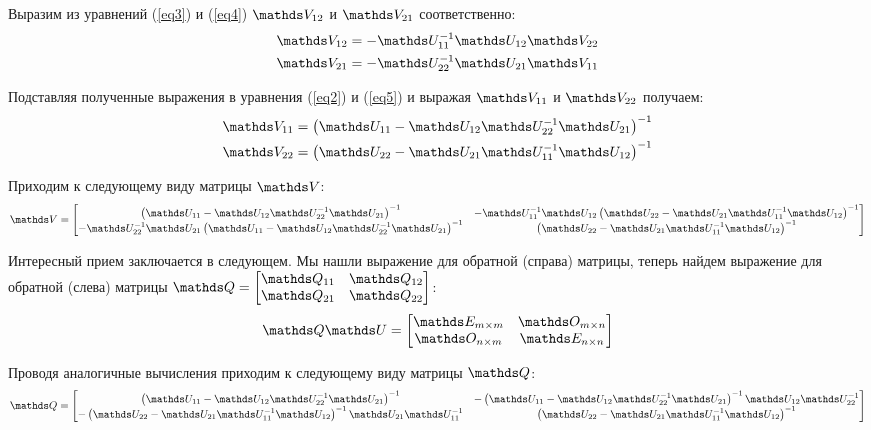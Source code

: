 Выразим из уравнений (\ref{eq3}) и (\ref{eq4}) $\bbV_{12}$ и $\bbV_{21}$ соответственно:
\begin{gather}
\bbV_{12} = - \bbU_{11}^{-1} \bbU_{12} \bbV_{22} \notag \\
\bbV_{21} = - \bbU_{22}^{-1} \bbU_{21} \bbV_{11} \notag
\end{gather}  

Подставляя полученные выражения в уравнения (\ref{eq2}) и (\ref{eq5}) и выражая $\bbV_{11}$ и $\bbV_{22}$ получаем:
\begin{gather}
\bbV_{11} = \lb \bbU_{11} - \bbU_{12} \bbU_{22}^{-1} \bbU_{21} \rb^{-1} \notag \\
\bbV_{22} = \lb \bbU_{22} - \bbU_{21} \bbU_{11}^{-1} \bbU_{12} \rb^{-1} \notag
\end{gather}

Приходим к следующему виду матрицы $\bbV$:
\begin{gather}
\bbV = \begin{bmatrix}
\lb \bbU_{11} - \bbU_{12} \bbU_{22}^{-1} \bbU_{21} \rb^{-1} & -\bbU_{11}^{-1} \bbU_{12} \lb \bbU_{22} - \bbU_{21} \bbU_{11}^{-1} \bbU_{12} \rb^{-1} \\
-\bbU_{22}^{-1} \bbU_{21} \lb \bbU_{11} - \bbU_{12} \bbU_{22}^{-1} \bbU_{21} \rb^{-1} &  \lb \bbU_{22} - \bbU_{21} \bbU_{11}^{-1} \bbU_{12} \rb^{-1} 
\end{bmatrix} \notag
\end{gather}

Интересный прием заключается в следующем.
Мы нашли выражение для обратной (справа) матрицы, теперь найдем выражение для обратной (слева) матрицы $\bbQ = \begin{bmatrix} \bbQ_{11} & \bbQ_{12} \\ \bbQ_{21} & \bbQ_{22} \end{bmatrix}$:
\begin{gather}
\bbQ \bbU = \begin{bmatrix}
\bbE_{m \times m} & \bbO_{m \times n} \\
\bbO_{n \times m} & \bbE_{n \times n} 
\end{bmatrix} \notag 
\end{gather} 

Проводя аналогичные вычисления приходим к следующему виду матрицы $\bbQ$:
\begin{gather}
\bbQ = \begin{bmatrix}
\lb \bbU_{11} - \bbU_{12} \bbU_{22}^{-1} \bbU_{21} \rb^{-1} & - \lb \bbU_{11} - \bbU_{12} \bbU_{22}^{-1} \bbU_{21} \rb^{-1} \bbU_{12} \bbU_{22}^{-1} \\
- \lb \bbU_{22} - \bbU_{21} \bbU_{11}^{-1} \bbU_{12} \rb^{-1} \bbU_{21} \bbU_{11}^{-1} & \lb \bbU_{22} - \bbU_{21} \bbU_{11}^{-1} \bbU_{12} \rb^{-1} 
\end{bmatrix} \notag
\end{gather}

